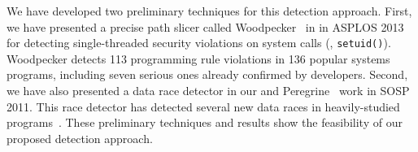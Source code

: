 



 


 We have developed two preliminary techniques for 
this detection approach. First, we have presented a precise path slicer called 
Woodpecker~\cite{woodpecker:asplos13} in in ASPLOS 2013 for detecting 
single-threaded security violations on system calls (\eg, \texttt{setuid()}). 
Woodpecker detects 113 programming rule violations in 136 popular systems 
programs, including seven serious ones already confirmed by developers. Second, 
we have also presented a data race detector in our 
and Peregrine~\cite{peregrine:sosp11} work in SOSP 2011. This race 
detector has detected several new data races in 
heavily-studied programs~\cite{wu:pldi12}. These preliminary techniques and 
results show the feasibility of our proposed detection approach.



